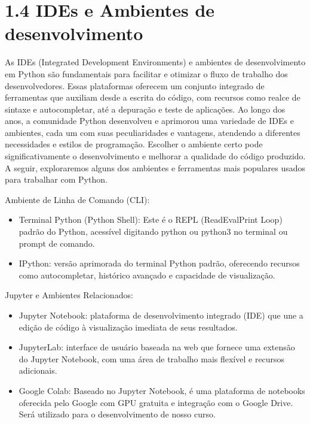 \documentclass[letterpaper,10pt,english]{jupyterBook}
\begin{document}
\section{1.4 IDEs e Ambientes de desenvolvimento}
\label{\detokenize{introducao:ides-e-ambientes-de-desenvolvimento}}
\sphinxAtStartPar
As IDEs (Integrated Development Environments) e ambientes de desenvolvimento em Python são fundamentais para facilitar e otimizar o fluxo de trabalho dos desenvolvedores. Essas plataformas oferecem um conjunto integrado de ferramentas que auxiliam desde a escrita do código, com recursos como realce de sintaxe e autocompletar, até a depuração e teste de aplicações. Ao longo dos anos, a comunidade Python desenvolveu e aprimorou uma variedade de IDEs e ambientes, cada um com suas peculiaridades e vantagens, atendendo a diferentes necessidades e estilos de programação. Escolher o ambiente certo pode significativamente o desenvolvimento e melhorar a qualidade do código produzido. A seguir, exploraremos alguns dos ambientes e ferramentas mais populares usados para trabalhar com Python.

\sphinxAtStartPar
Ambiente de Linha de Comando (CLI):
\begin{itemize}
\item {} 
\sphinxAtStartPar
Terminal Python (Python Shell): Este é o REPL (Read\sphinxhyphen{}Eval\sphinxhyphen{}Print Loop) padrão do Python, acessível digitando python ou python3 no terminal ou prompt de comando.

\item {} 
\sphinxAtStartPar
IPython: versão aprimorada do terminal Python padrão, oferecendo recursos como auto\sphinxhyphen{}completar, histórico avançado e capacidade de visualização.

\end{itemize}

\sphinxAtStartPar
Jupyter e Ambientes Relacionados:
\begin{itemize}
\item {} 
\sphinxAtStartPar
Jupyter Notebook: plataforma de desenvolvimento integrado (IDE) que une a edição de código à visualização imediata de seus resultados.

\item {} 
\sphinxAtStartPar
JupyterLab: interface de usuário baseada na web que fornece uma extensão do Jupyter Notebook, com uma área de trabalho mais flexível e recursos adicionais.

\item {} 
\sphinxAtStartPar
Google Colab: Baseado no Jupyter Notebook, é uma plataforma de notebooks oferecida pelo Google com GPU gratuita e integração com o Google Drive. Será utilizado para o desenvolvimento de nosso curso.

\end{itemize}
\end{document}
